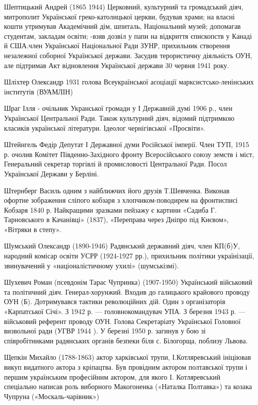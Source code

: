 Шептицький Андрей (1865 1944) Церковний, культурний та громадський діяч, митрополит Української греко-католицької церкви, будував храми; на власні кошти утримував Академічний дім, шпиталь, Національний музей; допомагав студентам, закладам освіти; -взяв дозвіл у папи на відкриття єпископств у Канаді й США.член Української Національної Ради ЗУНР, прихильник створення незалежної соборної Української держави. Засудив терористичну діяльність ОУН, але підтримав Акт відновлення Української держави 30 червня 1941 року. 

Шліхтер Олександр 1931 голова Всеукраїнської асоціації марксистсько-ленінських інститутів (ВУАМЛІН) 

Шраг Ілля - очільник Укранської громади у І Державній думі 1906 р., член Української Центральної Ради. Також культурний діяч, відомий підтримкою класиків української літератури. Ідеолог чернігівської «Просвіти».

Штейнгель Федір Депутат І Державної думи Російської імперії. Член ТУП,  1915 р. очолив Комітет Південно-Західного фронту Всеросійського союзу земств і міст, Генеральний секретар торгівлі й промисловості Центральної Ради. Посол Української Держави у Берліні. 

Штернберг Василь  одним з найближчих його друзів Т.Шевченка. Виконав офортне зображення сліпого кобзаря з хлопчиком-поводирем на фронтисписі Кобзаря 1840 р. Найкращими зразками пейзажу є картини  «Садиба Г. Тарновського в Качанівці» (1837), «Переправа через Дніпро під Києвом», «Вітряки в степу». 

Шумський Олександр (1890-1946) Радянський державний діяч, член КП(б)У, народний комісар освіти УСРР (1924-1927 рр.), прихильник політики українізації, звинувачений у «націоналістичному ухилі» (шумськізмі).

Шухевич Роман (псевдонім Тарас Чупринка) (1907-1950) Український військовий та політичний діяч. Генерал-хорунжий. Входив до галицького крайового проводу ОУН (Б). Дотримувався тактики революційних дій. Один з організаторів «Карпатської Січі». З 1942 р. --- головнокомандувач УПА. З березня 1943 р. --- військовий референт проводу ОУН. Голова Секретаріату Української Головної визвольної ради (УГВР 1944 ). У березні 1950 р. загинув у бою зі співробітниками радянських органів безпеки біля с. Білогорща, поблизу Львова. 

Щепкін Михайло  (1788-1863) актор харківської трупи, І.Котляревський ініціював викуп видатного актора з кріпацтва. Був провідним актором полтавської трупи і першим українським професійним актором, для якого І. Котляревський спеціально написав роль виборного Макогоненка («Наталка Полтавка») та козака Чупруна («Москаль-чарівник»)

